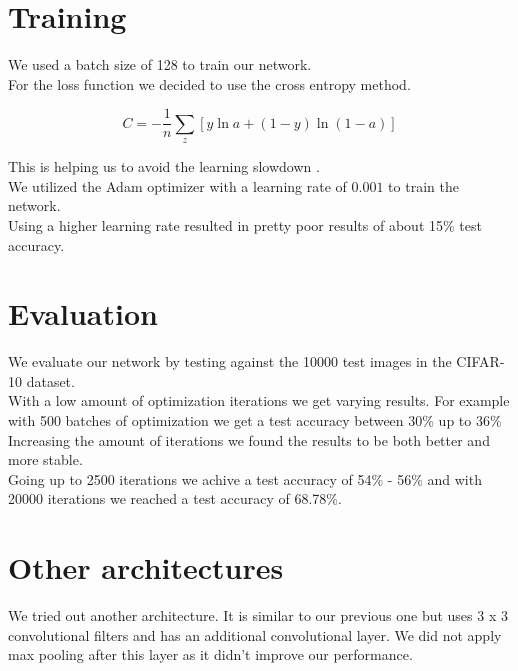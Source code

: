 \documentclass[twoside, twocolumn]{article}
\begin{document}

\section{Training}

We used a batch size of 128 to train our network. \\
For the loss function we decided to use the cross entropy method.

\begin{equation}
 C = - \dfrac{1}{n} \sum_{z} [y \ln a + (1 - y) \ln (1 - a)]
\end{equation}

This is helping us to avoid the learning slowdown \cite{crossentro}.\\
We utilized the Adam optimizer with a learning rate of $0.001$ to train the network. \\
Using a higher learning rate resulted in pretty poor results of about 15\% test accuracy.


\section{Evaluation}
We evaluate our network by testing against the 10000 test images in the CIFAR-10 dataset. \\
With a low amount of optimization iterations we get varying results. For example with 500 batches of optimization we get a test accuracy between 30\% up to 36\% \\
Increasing the amount of iterations we found the results to be both better and more stable. \\
Going up to 2500 iterations we achive a test accuracy of 54\% - 56\% and with 20000 iterations we reached a test accuracy of 68.78\%.




\section{Other architectures}
We tried out another architecture. It is similar to our previous one but uses 3 x 3 convolutional filters and has an additional convolutional layer. We did not apply max pooling after this layer as it didn't improve our performance. \\
\end{document}
